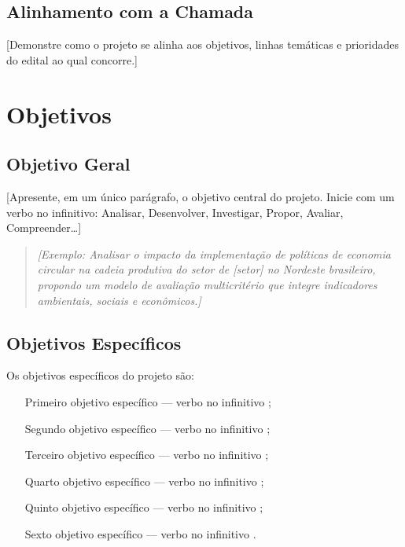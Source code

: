 \documentclass[
  12pt,
  a4paper,
  oneside,
  english,      %
  brazil
]{article}
\begin{document}
\subsection{Alinhamento com a Chamada}

[Demonstre como o projeto se alinha aos objetivos, linhas temáticas
e prioridades do edital ao qual concorre.]

\newpage
\section{Objetivos}

\subsection{Objetivo Geral}

[Apresente, em um único parágrafo, o objetivo central do projeto.
Inicie com um verbo no infinitivo: Analisar, Desenvolver, Investigar,
Propor, Avaliar, Compreender\ldots]

\begin{quote}
  \textit{[Exemplo: Analisar o impacto da implementação de políticas
  de economia circular na cadeia produtiva do setor de [setor] no
  Nordeste brasileiro, propondo um modelo de avaliação multicritério
  que integre indicadores ambientais, sociais e econômicos.]}
\end{quote}

\subsection{Objetivos Específicos}

Os objetivos específicos do projeto são:

\begin{enumerate}
  \item [Primeiro objetivo específico — verbo no infinitivo];
  \item [Segundo objetivo específico — verbo no infinitivo];
  \item [Terceiro objetivo específico — verbo no infinitivo];
  \item [Quarto objetivo específico — verbo no infinitivo];
  \item [Quinto objetivo específico — verbo no infinitivo];
  \item [Sexto objetivo específico — verbo no infinitivo].
\end{enumerate}
\end{document}
